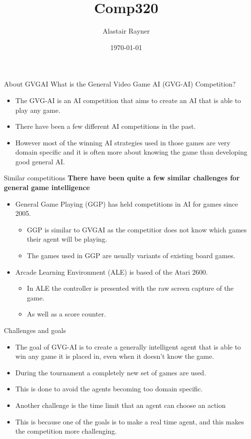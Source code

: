 \documentclass{beamer}
\title{Comp320}
\author{Alastair Rayner}
\date{\today}
\begin{document}
\maketitle


\begin{frame}{About GVGAI}
	  What is the General Video Game AI (GVG-AI) Competition? \pause
	  \begin{itemize}
	      \item The GVG-AI is an AI competition that aims to create an AI that is able to play any game. \pause
	      \item There have been a few different AI competitions in the past. \pause
	      \item However most of the winning AI strategies used in those games are very domain specific and it is often more about knowing the game than developing good general AI. \pause
	  \end{itemize}
\end{frame}


\begin{frame}{Similar competitions}	
	\textbf{There have been quite a few similar challenges for general game intelligence} \pause
		\begin{itemize}
			\item General Game Playing (GGP) has held competitions in AI for games since 2005.
			\begin{itemize}
				\item GGP is similar to GVGAI as the competitior does not know which games their agent will be playing.
				\item The games used in GGP are usually variants of existing board games.
			\end{itemize}
			\item Arcade Learning Environment (ALE) is based of the Atari 2600.
			\begin{itemize}
				\item In ALE the controller is presented with the raw screen capture of the game.
				\item As well as a score counter.
			\end{itemize}
		\end{itemize}
\end{frame}

\begin{frame}{Challenges and goals}		
			\begin{itemize}
			\item The goal of GVG-AI is to create a generally intelligent agent that is able to win any game it is placed in, even when it doesn't know the game.
			\item During the tournament a completely new set of games are used.
			\item This is done to avoid the agents becoming too domain specific.
			\item Another challenge is the time limit that an agent can choose an action
			\item This is because one of the goals is to make a real time agent, and this makes the competition more challenging.
		\end{itemize}
\end{frame}
	
\end{document}
